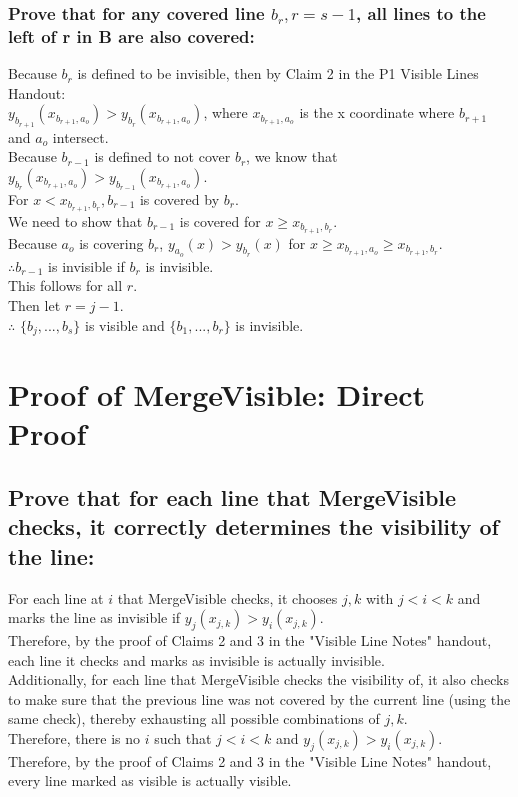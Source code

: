 \documentclass{article}
\begin{document}
    \subsubsection*{Prove that for any covered line  $b_{r}, r = s - 1$, all lines to the left of r in B are also covered:}
        Because $b_r$ is defined to be invisible, then by Claim 2 in the P1 Visible Lines Handout:\\
        $y_{b_{r+1}}(x_{b_{r+1}, a_{o}}) > y_{b_{r}}(x_{b_{r+1},a_{o}})$, where $x_{b_{r+1}, a_{o}}$ is the x coordinate where $b_{r+1}$ and $a_o$ intersect.\\
        Because $b_{r-1}$ is defined to not cover $b_r$, we know that $y_{b_{r}}(x_{b_{r+1}, a_{o}}) > y_{b_{r-1}}(x_{b_{r+1},a_{o}})$.\\
        For $x < x_{b_{r+1},b_{r}}, b_{r-1}$ is covered by $b_r$.\\
        We need to show that $b_{r-1}$ is covered for $x \geq x_{b_{r+1},b_{r}}$.\\
        Because $a_o$ is covering $b_r$, $y_{a_{o}}(x) > y_{b_{r}}(x)$ for $x \geq x_{b_{r+1},a_{o}} \geq x_{b_{r+1},b_{r}}$.\\
        $\therefore b_{r-1}$ is invisible if $b_r$ is invisible.\\
        This follows for all $r$.\\
        Then let $r = j - 1$.\\
        $\therefore$ $\{b_j,...,b_s\}$ is visible and $\{b_1,...,b_{r}\}$ is invisible.\\

\section*{Proof of MergeVisible: Direct Proof}

\subsection*{Prove that for each line that MergeVisible checks, it correctly determines the visibility of the line:}
For each line at $i$ that MergeVisible checks, it chooses $j, k$ with $j < i < k$ and marks the line as invisible if $y_j (x_{j,k}) > y_i(x_{j,k})$.\\
Therefore, by the proof of Claims 2 and 3 in the "Visible Line Notes" handout, each line it checks and marks as invisible is actually invisible.\\
Additionally, for each line that MergeVisible checks the visibility of, it also checks to make sure that the previous line was not covered by the current line (using the same check), thereby exhausting all possible combinations of $j, k$.\\
Therefore, there is no $i$ such that $j < i < k$ and $y_j (x_{j,k}) > y_i(x_{j,k})$.\\
Therefore, by the proof of Claims 2 and 3 in the "Visible Line Notes" handout, every line marked as visible is actually visible.
\end{document}
